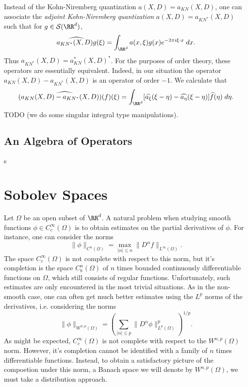 \begin{remark}
  Instead of the Kohn-Niremberg quantization $a(X,D) = a_{KN}(X,D)$, one can associate the \emph{adjoint Kohn-Niremberg quantization} $a(X,D) = a_{KN^*}(X,D)$ such that for $g \in \mathcal{S}(\RR^d)$,
  \[ \widehat{a_{KN^*}(X,D) g}(\xi) = \int_{\RR^d} a(x,\xi) g(x) e^{-2 \pi i \xi \cdot x}\; dx. \]
  Thus $a_{KN^*}(X,D) = a^*_{KN}(X,D)^*$. For the purposes of order theory, these operators are essentially equivalent. Indeed, in our situation the operator $a_{KN}(X,D) - a_{KN^*}(X,D)$ is an operator of order $-1$. We calculate that
  \[ \widehat{(a_{KN}(X,D) - a_{KN^*}(X,D))(f)}(\xi) = \int_{\RR^d} [\widehat{a_\xi}(\xi - \eta) - \widehat{a_\eta}(\xi - \eta)] \widehat{f}(\eta)\; d\eta. \]
  TODO (we do some singular integral type manipulations).
\end{remark}

\section{An Algebra of Operators}

s











\chapter{Sobolev Spaces}

Let $\Omega$ be an open subset of $\RR^d$. A natural problem when studying smooth functions $\phi \in C_c^\infty(\Omega)$ is to obtain estimates on the partial derivatives of $\phi$. For instance, one can consider the norms
%
\[ \| \phi \|_{C^n(\Omega)} = \max_{|\alpha| \leq n} \| D^\alpha f \|_{L^\infty(\Omega)}. \]
%
The space $C_c^\infty(\Omega)$ is not complete with respect to this norm, but it's completion is the space $C^n_b(\Omega)$ of $n$ times bounded continuously differentiable functions on $\Omega$, which still consists of regular functions. Unfortunately, such estimates are only encountered in the most trivial situations. As in the non-smooth case, one can often get much better estimates using the $L^p$ norms of the derivatives, i.e. considering the norms
%
\[ \| \phi \|_{W^{n,p}(\Omega)} = \left( \sum_{|\alpha| \leq p} \| D^\alpha \phi \|_{L^p(\Omega)}^p \right)^{1/p}. \]
%
As might be expected, $C_c^\infty(\Omega)$ is not complete with respect to the $W^{n,p}(\Omega)$ norm. However, it's completion cannot be identified with a family of $n$ times differentiable functions. Instead, to obtain a satisfactory picture of the compoetion under this norm, a Banach space we will denote by $W^{n,p}(\Omega)$, we must take a distribution approach.

